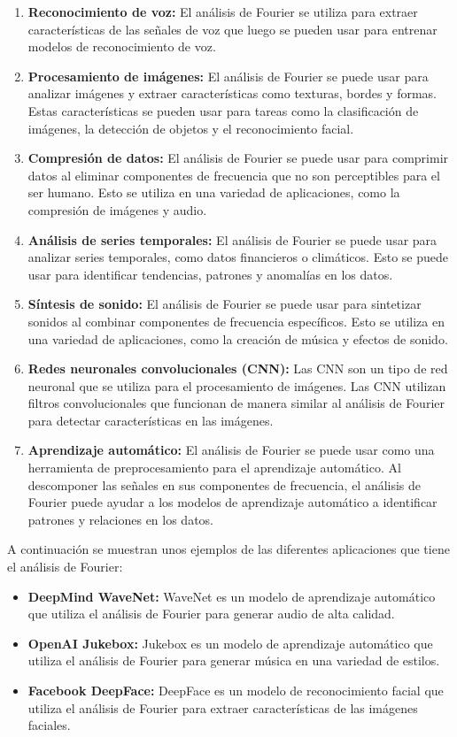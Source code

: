 \begin{enumerate} \def\labelenumi{\alph{enumi}.} \item   \textbf{Reconocimiento de voz:} El análisis de Fourier se utiliza para   extraer características de las señales de voz que luego se pueden usar   para entrenar modelos de reconocimiento de voz. \item   \textbf{Procesamiento de imágenes:} El análisis de Fourier se puede   usar para analizar imágenes y extraer características como texturas,   bordes y formas. Estas características se pueden usar para tareas como   la clasificación de imágenes, la detección de objetos y el   reconocimiento facial. \item   \textbf{Compresión de datos:} El análisis de Fourier se puede usar   para comprimir datos al eliminar componentes de frecuencia que no son   perceptibles para el ser humano. Esto se utiliza en una variedad de   aplicaciones, como la compresión de imágenes y audio. \item   \textbf{Análisis de series temporales:} El análisis de Fourier se   puede usar para analizar series temporales, como datos financieros o   climáticos. Esto se puede usar para identificar tendencias, patrones y   anomalías en los datos. \item   \textbf{Síntesis de sonido:} El análisis de Fourier se puede usar para   sintetizar sonidos al combinar componentes de frecuencia específicos.   Esto se utiliza en una variedad de aplicaciones, como la creación de   música y efectos de sonido. \item   \textbf{Redes neuronales convolucionales (CNN):} Las CNN son un tipo   de red neuronal que se utiliza para el procesamiento de imágenes. Las   CNN utilizan filtros convolucionales que funcionan de manera similar   al análisis de Fourier para detectar características en las imágenes. \item   \textbf{Aprendizaje automático:} El análisis de Fourier se puede usar   como una herramienta de preprocesamiento para el aprendizaje   automático. Al descomponer las señales en sus componentes de   frecuencia, el análisis de Fourier puede ayudar a los modelos de   aprendizaje automático a identificar patrones y relaciones en los   datos. \end{enumerate}

A continuación se muestran unos ejemplos de las diferentes aplicaciones que tiene el análisis de Fourier:

\begin{itemize} \item   \textbf{DeepMind WaveNet:} WaveNet es un modelo de aprendizaje   automático que utiliza el análisis de Fourier para generar audio de   alta calidad. \item   \textbf{OpenAI Jukebox:} Jukebox es un modelo de aprendizaje   automático que utiliza el análisis de Fourier para generar música en   una variedad de estilos. \item   \textbf{Facebook DeepFace:} DeepFace es un modelo de reconocimiento   facial que utiliza el análisis de Fourier para extraer características   de las imágenes faciales. \end{itemize}


